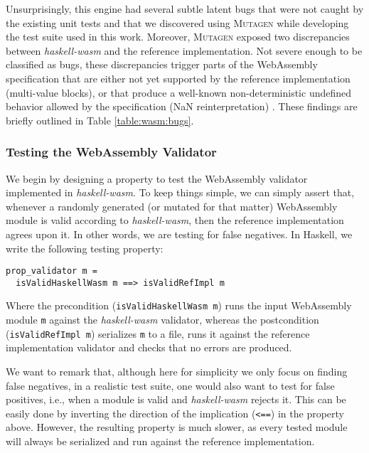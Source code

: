 \documentclass[sigconf, anonymous]{acmart}
\newcommand{\mutagen}{\textsc{Mutagen}\xspace}
\begin{document}
Unsurprisingly, this engine had several subtle latent bugs that were not caught
by the existing unit tests and that we discovered using \mutagen while
developing the test suite used in this work.
%
Moreover, \mutagen exposed two discrepancies between \textit{haskell-wasm} and
the reference implementation.
%
Not severe enough to be classified as bugs, these discrepancies trigger parts of
the WebAssembly specification that are either not yet supported by the reference
implementation (multi-value blocks), or that produce a well-known
non-deterministic undefined behavior allowed by the specification (NaN
reinterpretation) \cite{perenyi2020stack}.
%
These findings are briefly outlined in Table \ref{table:wasm:bugs}.


\subsubsection{Testing the WebAssembly Validator}

We begin by designing a property to test the WebAssembly validator implemented
in \textit{haskell-wasm}.
%
To keep things simple, we can simply assert that, whenever a randomly generated
(or mutated for that matter) WebAssembly module is valid according to
\textit{haskell-wasm}, then the reference implementation agrees upon it.
%
In other words, we are testing for false negatives.
%
In Haskell, we write the following testing property:

\begin{verbatim}
prop_validator m =
  isValidHaskellWasm m ==> isValidRefImpl m
\end{verbatim}

Where the precondition (\texttt{isValidHaskellWasm m}) runs the input WebAssembly
module \texttt{m} against the \textit{haskell-wasm} validator, whereas the
postcondition (\texttt{isValidRefImpl m}) serializes \texttt{m} to a file, runs it
against the reference implementation validator and checks that no errors are
produced.

We want to remark that, although here for simplicity we only focus on finding
false negatives, in a realistic test suite, one would also want to test for
false positives, i.e., when a module is valid and \textit{haskell-wasm} rejects
it.
%
This can be easily done by inverting the direction of the implication
(\texttt{<==}) in the property above.
%
However, the resulting property is much slower, as every tested module will
always be serialized and run against the reference implementation.
\end{document}
